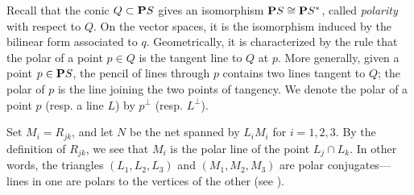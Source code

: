 \documentclass{amsart}
\renewcommand {\P}{{\bf P}}
\numberwithin{equation}{section}
\begin{document}
Recall that the conic $Q \subset \P S$ gives an isomorphism $\P S \cong \P S^*$, called \emph{polarity} with respect to $Q$.
On the vector spaces, it is the isomorphism induced by the bilinear form associated to $q$.
Geometrically, it is characterized by the rule that the polar of a point $p \in Q$ is the tangent line to $Q$ at $p$.
More generally, given a point $p \in \P S$, the pencil of lines through $p$ contains two lines tangent to $Q$; the polar of $p$ is the line joining the two points of tangency.
We denote the polar of a point $p$ (resp. a line $L$) by $p^\perp$ (resp. $L^\perp$).

Set $M_i = R_{jk}$, and let $N$ be the net spanned by $L_iM_i$ for $i = 1, 2, 3$.
By the definition of $R_{jk}$, we see that $M_i$ is the polar line of the point $L_j \cap L_k$.
In other words, the triangles $(L_1, L_2, L_3)$ and $(M_1, M_2, M_3)$ are polar conjugates---lines in one are polars to the vertices of the other (see \cite[\S~2.1.4]{dol:12}).
\end{document}
